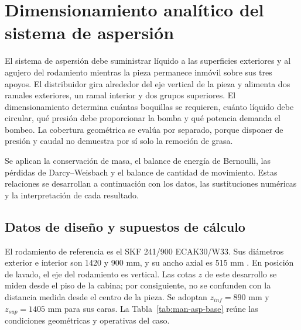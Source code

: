 \section{Dimensionamiento analítico del sistema de aspersión}
\label{sec:man-asp-base}

El sistema de aspersión debe suministrar líquido a las superficies exteriores
y al agujero del rodamiento mientras la pieza permanece inmóvil sobre sus
tres apoyos. El distribuidor gira alrededor del eje vertical de la pieza y
alimenta dos ramales exteriores, un ramal interior y dos grupos superiores.
El dimensionamiento determina cuántas boquillas se requieren, cuánto
líquido debe circular, qué presión debe proporcionar la bomba y qué potencia
demanda el bombeo. La cobertura geométrica se evalúa por separado, porque
disponer de presión y caudal no demuestra por sí solo la remoción de grasa.

Se aplican la conservación de masa, el balance de energía de Bernoulli,
las pérdidas de Darcy--Weisbach y el balance de cantidad de movimiento.
Estas relaciones se desarrollan a continuación con los datos, las
sustituciones numéricas y la interpretación de cada resultado.

\subsection{Datos de diseño y supuestos de cálculo}
\label{sec:man-asp-datos}

El rodamiento de referencia es el SKF 241/900 ECAK30/W33. Sus diámetros
exterior e interior son 1420 y 900 mm, y su ancho axial es 515 mm
\cite{skf241}. En posición de lavado, el eje del rodamiento es vertical.
Las cotas $z$ de este desarrollo se miden desde el piso de la cabina; por
consiguiente, no se confunden con la distancia medida desde el centro de
la pieza. Se adoptan $z_{inf}=890$ mm y $z_{sup}=1405$ mm para sus caras. La
Tabla~\ref{tab:man-asp-base} reúne las condiciones geométricas y operativas del caso.

